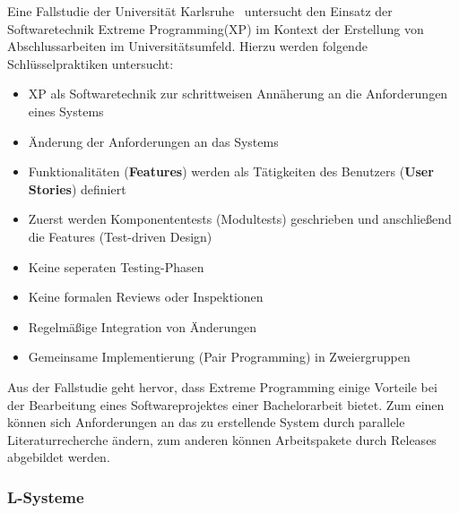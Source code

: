 Eine Fallstudie der Universität Karlsruhe~\cite{muller_2001} untersucht den Einsatz der Softwaretechnik Extreme
Programming(XP) im Kontext der Erstellung von Abschlussarbeiten im Universitätsumfeld.
Hierzu werden folgende Schlüsselpraktiken untersucht:
\begin{itemize}
    \item XP als Softwaretechnik zur schrittweisen Annäherung an die Anforderungen eines Systems
    \item Änderung der Anforderungen an das Systems
    \item Funktionalitäten (\textbf{Features}) werden als Tätigkeiten des Benutzers (\textbf{User Stories}) definiert
    \item Zuerst werden Komponententests (Modultests) geschrieben und anschließend die Features (Test-driven Design)
    \item Keine seperaten Testing-Phasen
    \item Keine formalen Reviews oder Inspektionen
    \item Regelmäßige Integration von Änderungen
    \item Gemeinsame Implementierung (Pair Programming) in Zweiergruppen
\end{itemize}
Aus der Fallstudie geht hervor, dass Extreme Programming einige Vorteile bei der Bearbeitung eines Softwareprojektes
einer Bachelorarbeit bietet.
Zum einen können sich Anforderungen an das zu erstellende System durch parallele Literaturrecherche ändern, zum
anderen können Arbeitspakete durch Releases abgebildet werden.

\subsubsection{L-Systeme}

